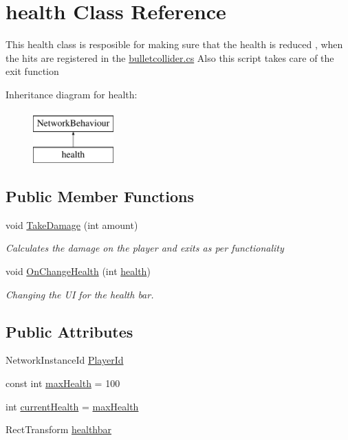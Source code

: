 \hypertarget{classhealth}{}\section{health Class Reference}
\label{classhealth}


This health class is resposible for making sure that the health is reduced , when the hits are registered in the \mbox{\hyperlink{bulletcollider_8cs}{bulletcollider.\+cs}} Also this script takes care of the exit function  


Inheritance diagram for health\+:\begin{figure}[H]
\begin{center}
\leavevmode
\includegraphics[height=2.000000cm]{classhealth}
\end{center}
\end{figure}
\subsection*{Public Member Functions}
\begin{DoxyCompactItemize}
\item 
void \mbox{\hyperlink{classhealth_a7356a64035ee03262ec7fca1af42eff1}{Take\+Damage}} (int amount)
\begin{DoxyCompactList}\small\item\em Calculates the damage on the player and exits as per functionality \end{DoxyCompactList}\item 
void \mbox{\hyperlink{classhealth_a63f6a51cc26465e3a46eb81a578bcf1d}{On\+Change\+Health}} (int \mbox{\hyperlink{classhealth}{health}})
\begin{DoxyCompactList}\small\item\em Changing the UI for the health bar. \end{DoxyCompactList}\end{DoxyCompactItemize}
\subsection*{Public Attributes}
\begin{DoxyCompactItemize}
\item 
Network\+Instance\+Id \mbox{\hyperlink{classhealth_a53480daaacaa8f112112ab692cfb4e00}{Player\+Id}}
\item 
const int \mbox{\hyperlink{classhealth_a03ad8e4011a7094e3fbec6dcd7ff946c}{max\+Health}} = 100
\item 
int \mbox{\hyperlink{classhealth_a50db37d3af48df3d68a1c7a415f7de53}{current\+Health}} = \mbox{\hyperlink{classhealth_a03ad8e4011a7094e3fbec6dcd7ff946c}{max\+Health}}
\item 
Rect\+Transform \mbox{\hyperlink{classhealth_ae6062530fe2e6cf803cab4eda97db4c9}{healthbar}}
\end{DoxyCompactItemize}


